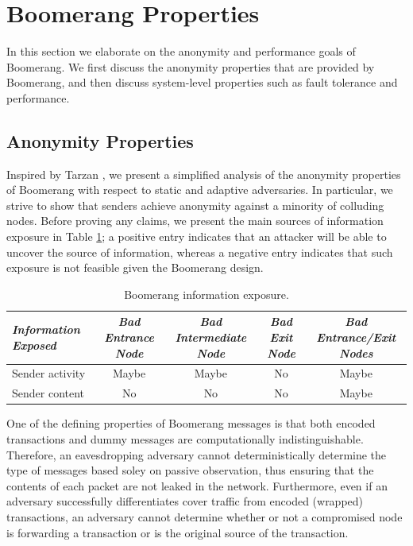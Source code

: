 \section{Boomerang Properties} \label{sec:properties}
In this section we elaborate on the anonymity and performance goals of Boomerang. We first discuss the anonymity properties that are provided by Boomerang, and then discuss system-level properties such as fault tolerance and performance.

\subsection{Anonymity Properties}
Inspired by Tarzan \cite{tarzan}, we present a simplified analysis of the anonymity properties of Boomerang with respect to static and adaptive adversaries. In particular, we strive to show that senders achieve anonymity against a minority of colluding nodes. Before proving any claims, we present the main sources of information exposure in Table \ref{tab:anonymity-properties}; a positive entry indicates that an attacker will be able to uncover the source of information, whereas a negative entry indicates that such exposure is not feasible given the Boomerang design.

\begin{table}[t]
\begin{center}
	\caption {Boomerang information exposure.}
    \label{tab:anonymity-properties}
    \begin{tabular}{|l||c|c|c|c|}
    \hline
    \emph{Information Exposed} & \emph{Bad Entrance Node} & \emph{Bad Intermediate Node} & \emph{Bad Exit Node} & \emph{Bad Entrance/Exit Nodes} \\ \hline \hline
    Sender activity & Maybe    & Maybe & No & Maybe \\ \hline
    Sender content  & No       & No    & No & Maybe \\ \hline
    \end{tabular}
\end{center}
\end{table}

One of the defining properties of Boomerang messages is that both encoded transactions and dummy messages are computationally indistinguishable. Therefore, an eavesdropping adversary cannot deterministically determine the type of messages based soley on passive observation, thus ensuring that the contents of each packet are not leaked in the network. Furthermore, even if an adversary successfully differentiates cover traffic from encoded (wrapped) transactions, an adversary cannot determine whether or not a compromised node is forwarding a transaction or is the original source of the transaction.

